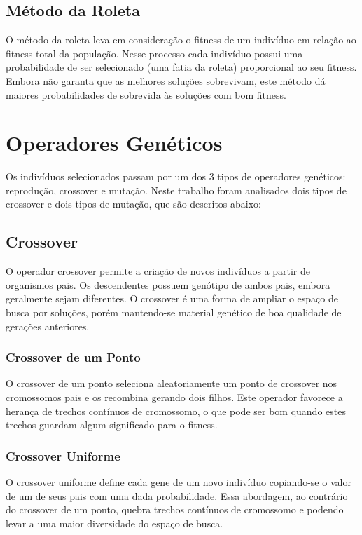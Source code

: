 \documentclass[conference]{IEEEtran}
\begin{document}
\subsection{Método da Roleta}
O método da roleta leva em consideração o fitness de um indivíduo em relação ao
fitness total da população. Nesse processo cada indivíduo possui uma 
probabilidade de ser selecionado (uma fatia da roleta) proporcional ao seu
fitness. Embora não garanta que as melhores soluções sobrevivam, este método
dá maiores probabilidades de sobrevida às soluções com bom fitness.

\section{Operadores Genéticos}
Os indivíduos selecionados passam por um dos 3 tipos de operadores
genéticos: reprodução, crossover e mutação. Neste trabalho foram analisados
dois tipos de crossover e dois tipos de mutação, que são descritos abaixo:\\

\subsection{Crossover}
O operador crossover permite a criação de novos indivíduos a partir de
organismos pais. Os descendentes possuem genótipo de ambos pais, embora
geralmente sejam diferentes. O crossover é uma forma de ampliar o espaço de
busca por soluções, porém mantendo-se material genético de boa qualidade de
gerações anteriores.

\subsubsection{Crossover de um Ponto}
O crossover de um ponto seleciona aleatoriamente um ponto de crossover nos
cromossomos pais e os recombina gerando dois filhos. Este operador favorece a
herança de trechos contínuos de cromossomo, o que pode ser bom quando estes
trechos guardam algum significado para o fitness.

\subsubsection{Crossover Uniforme}
O crossover uniforme define cada gene de um novo indivíduo copiando-se o valor
de um de seus pais com uma dada probabilidade. Essa abordagem, ao contrário do
crossover de um ponto, quebra trechos contínuos de cromossomo e podendo levar a
uma maior diversidade do espaço de busca.
\end{document}
